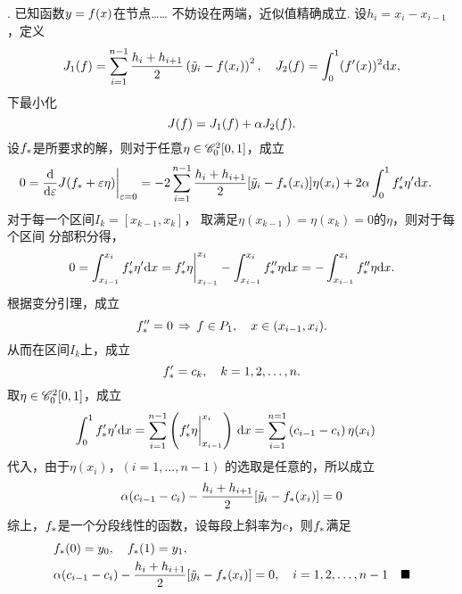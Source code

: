 \vspace{1cm}
\par{}. 已知函数$y=\mathnormal{f}(x)$在节点……
\ans
  不妨设在两端，近似值精确成立.
  设$h_i = x_i-x_{i-1}$，定义
  \[
    J_1(\mathnormal{f}) = \sum_{i=1}^{n-1}\frac{h_i+h_{i+1}}{2}
    \left( \tilde{y}_i - \mathnormal{f}(x_i) \right)^2, \quad
    J_2(\mathnormal{f}) = \int_0^1 (\mathnormal{f}^{\prime}(x))^2\mathrm{d} x,
  \]
  下最小化
  \[
    J(\mathnormal{f}) = J_1(\mathnormal{f}) + \alpha J_2(\mathnormal{f}).
  \]
  设$\mathnormal{f}_*$是所要求的解，则对于任意$\eta\in\mathscr{C}_0^2[0, 1]$，成立
  \begin{equation}\begin{split}
    \label{equ: 导数为零}
    0 &= \frac{\mathrm{d}}{\mathrm{d}\varepsilon}J(\mathnormal{f}_*+\varepsilon\eta)\bigg|_{\varepsilon=0} =
    -2\sum_{i=1}^{n-1}\frac{h_i+h_{i+1}}{2}[\tilde{y}_i-\mathnormal{f}_*(x_i)]\eta(x_i)
    +2\alpha\int_0^1\mathnormal{f}_*^{\prime}\eta^{\prime}\mathrm{d} x.
  \end{split}\end{equation}
  对于每一个区间$I_k = [x_{k-1}, x_k]$，
  取满足$\eta(x_{k-1}) = \eta(x_k) =0$的$\eta$，则对于每个区间
  分部积分得，
  \[
    0 = \int_{x_{i-1}}^{x_i}\mathnormal{f}_*^{\prime}\eta^{\prime}\mathrm{d} x
    = \mathnormal{f}_*^{\prime}\eta\bigg|_{x_{i-1}}^{x_i}
     - \int_{x_{i-1}}^{x_i}\mathnormal{f}_*^{\prime\prime}\eta\mathrm{d} x
     = - \int_{x_{i-1}}^{x_i}\mathnormal{f}_*^{\prime\prime}\eta\mathrm{d} x.
  \]
  根据变分引理，成立
  \[
    \label{equ: 线性}
    \mathnormal{f}_*^{\prime\prime} = 0 \,\Rightarrow\,
    \mathnormal{f}\in P_1,\quad x\in(x_{i-1}, x_i).
  \]
  从而在区间$I_k$上，成立
  \[
    \mathnormal{f}_*^{\prime} = c_k,\quad k = 1,2,\dots,n.
  \]
  取$\eta\in\mathscr{C}^2_0[0, 1]$，成立
  \[\begin{split}
    \int_0^1 \mathnormal{f}_*^{\prime}\eta^{\prime} \mathrm{d} x &=
    \sum_{i=1}^{n-1} \left(
        \mathnormal{f}_*^{\prime}\eta\bigg|_{x_{i-1}}^{x_i}
    \right)\,\mathrm{d} x = \sum_{i=1}^{n=1} \left(
      c_{i-1} - c_i
    \right)\eta(x_i)
  \end{split}\]
  代入，由于$\eta(x_i)$，$(i=1,\dots,n-1)$
  的选取是任意的，所以成立
  \[
    \alpha(c_{i-1}-c_i) - \frac{h_i+h_{i+1}}{2}[\tilde{y}_i - \mathnormal{f}_*(x_i)] = 0
  \]
  综上，$\mathnormal{f}_*$是一个分段线性的函数，设每段上斜率为$c$，则$\mathnormal{f}_*$满足
  \[\begin{split}
    &\mathnormal{f}_*(0) = y_0,\quad f_*(1) = y_1, \\
    &\alpha(c_{i-1} - c_i) - \frac{h_i+h_{i+1}}{2}[\tilde{y}_i-\mathnormal{f}_*(x_i)] = 0,
    \quad i = 1,2,\dots,n-1\quad\blacksquare
  \end{split}\]


